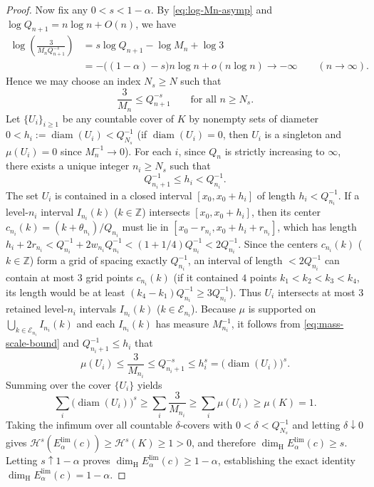 \documentclass[11pt]{article}
\theoremstyle{definition}
\theoremstyle{remark}
\newcommand{\Z}{\mathbb{Z}}
\newcommand{\dimH}{\dim_{\mathrm{H}}}
\begin{document}
\begin{proof}
Now fix any $0<s<1-\alpha$. By \eqref{eq:log-Mn-asymp} and
$\log Q_{n+1}=n\log n+O(n)$, we have
\begin{align*}
\log\left(\frac{3}{M_n Q_{n+1}^{-s}}\right)
&=s\log Q_{n+1}-\log M_n+\log 3\\
&=-\bigl((1-\alpha)-s\bigr)n\log n+o(n\log n)\longrightarrow-\infty
\qquad(n\to\infty).
\end{align*}
Hence we may choose an index $N_s\ge N$ such that
\begin{equation}\label{eq:mass-scale-bound}
\frac{3}{M_n}\le Q_{n+1}^{-s}\qquad\text{for all }n\ge N_s.
\end{equation}
Let $\{U_i\}_{i\ge1}$ be any countable cover of $K$ by nonempty sets of diameter
$0<h_i:=\operatorname{diam}(U_i)<Q_{N_s}^{-1}$ (if $\operatorname{diam}(U_i)=0$,
then $U_i$ is a singleton and $\mu(U_i)=0$ since $M_n^{-1}\to0$). For each $i$,
since $Q_n$ is strictly increasing to $\infty$, there exists a unique integer
$n_i\ge N_s$ such that
\[
Q_{n_i+1}^{-1}\le h_i<Q_{n_i}^{-1}.
\]
The set $U_i$ is contained in a closed interval $[x_0,x_0+h_i]$ of length
$h_i<Q_{n_i}^{-1}$. If a level-$n_i$ interval $I_{n_i}(k)$ ($k\in\Z$) intersects
$[x_0,x_0+h_i]$, then its center $c_{n_i}(k)=(k+\theta_{n_i})/Q_{n_i}$ must lie
in $[x_0-r_{n_i},x_0+h_i+r_{n_i}]$, which has length
$h_i+2r_{n_i}<Q_{n_i}^{-1}+2w_{n_i}Q_{n_i}^{-1}<(1+1/4)Q_{n_i}^{-1}<2Q_{n_i}^{-1}$.
Since the centers $c_{n_i}(k)$ ($k\in\Z$) form a grid of spacing exactly
$Q_{n_i}^{-1}$, an interval of length $<2Q_{n_i}^{-1}$ can contain at most $3$
grid points $c_{n_i}(k)$ (if it contained $4$ points $k_1<k_2<k_3<k_4$, its
length would be at least $(k_4-k_1)Q_{n_i}^{-1}\ge3Q_{n_i}^{-1}$). Thus $U_i$
intersects at most $3$ retained level-$n_i$ intervals $I_{n_i}(k)$
($k\in\mathcal E_{n_i}$). Because $\mu$ is supported on
$\bigcup_{k\in\mathcal E_{n_i}}I_{n_i}(k)$ and each $I_{n_i}(k)$ has measure
$M_{n_i}^{-1}$, it follows from \eqref{eq:mass-scale-bound} and
$Q_{n_i+1}^{-1}\le h_i$ that
\[
\mu(U_i)\le\frac{3}{M_{n_i}}\le Q_{n_i+1}^{-s}\le h_i^s=\bigl(\operatorname{diam}(U_i)\bigr)^s.
\]
Summing over the cover $\{U_i\}$ yields
\[
\sum_{i}\bigl(\operatorname{diam}(U_i)\bigr)^s
\ge\sum_{i}\frac{3}{M_{n_i}}\ge\sum_{i}\mu(U_i)\ge\mu(K)=1.
\]
Taking the infimum over all countable $\delta$-covers with
$0<\delta<Q_{N_s}^{-1}$ and letting $\delta\downarrow0$ gives
$\mathcal H^s(E_{\alpha}^{\mathrm{lim}}(c))\ge\mathcal H^s(K)\ge1>0$, and therefore
$\dimH E_{\alpha}^{\mathrm{lim}}(c)\ge s$. Letting $s\uparrow1-\alpha$ proves
$\dimH E_{\alpha}^{\mathrm{lim}}(c)\ge1-\alpha$, establishing the exact identity
$\dimH E_{\alpha}^{\mathrm{lim}}(c)=1-\alpha$.


\end{proof}
\end{document}
